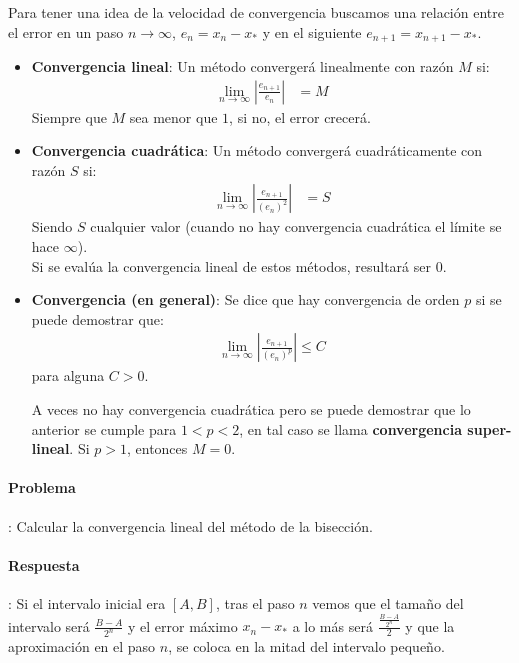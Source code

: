 \documentclass[spanish, fleqn]{article}
\begin{document}
Para tener una idea de la velocidad de convergencia buscamos una relación entre el error en un paso $n\rightarrow \infty$, $e_n= x_n-x_*$ y en el siguiente $e_{n+1}= x_{n+1}-x_*$.

\begin{itemize}
\item \textbf{Convergencia lineal}: Un método convergerá linealmente con razón $M$ si:
\begin{align*}
\lim_{n\rightarrow \infty} \left|\frac{e_{n+1}}{e_n}\right| &= M
\end{align*}
Siempre que $M$ sea menor que $1$, si no, el error crecerá.
\item \textbf{Convergencia cuadrática}: Un método convergerá cuadráticamente con razón $S$ si:
\begin{align*}
\lim_{n\rightarrow \infty} \left|\frac{e_{n+1}}{(e_n)^2}\right| &= S
\end{align*}
Siendo $S$ cualquier valor (cuando no hay convergencia cuadrática el límite se hace $\infty$).\\
Si se evalúa la convergencia lineal de estos métodos, resultará ser $0$.
\item \textbf{Convergencia (en general)}: Se dice que hay convergencia de orden $p$ si se puede demostrar que:
\begin{align*}
\lim_{n\rightarrow \infty} \left|\frac{e_{n+1}}{(e_n)^p}\right| \leq C
\end{align*}
para alguna $C>0$.

A veces no hay convergencia cuadrática pero se puede demostrar que lo anterior se cumple para $1<p<2$, en tal caso se llama \textbf{convergencia super-lineal}. Si $p>1$, entonces $M=0$.
\end{itemize}

\paragraph{Problema}: Calcular la convergencia lineal del método de la bisección.

\paragraph{Respuesta}: Si el intervalo inicial era $[A,B]$, tras el paso $n$ vemos que el tamaño del intervalo será $\frac{B-A}{2^n}$ y el error máximo $x_n-x_*$ a lo más será $\frac{\frac{B-A}{2^n}}{2}$ y que la aproximación en el paso $n$, se coloca en la mitad del intervalo pequeño.
\end{document}
